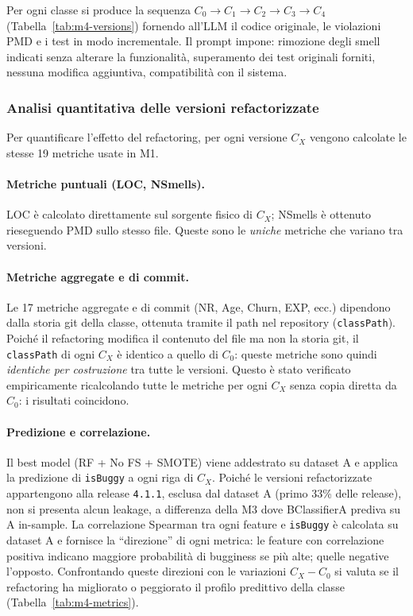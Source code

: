 Per ogni classe si produce la sequenza $C_0 \!\to\! C_1 \!\to\! C_2 \!\to\! C_3
\!\to\! C_4$ (Tabella~\ref{tab:m4-versions}) fornendo all'LLM il codice originale,
le violazioni PMD e i test in modo incrementale.
Il prompt impone: rimozione degli smell indicati senza alterare la funzionalità,
superamento dei test originali forniti, nessuna modifica aggiuntiva, compatibilità con il sistema.

\subsubsection{Analisi quantitativa delle versioni refactorizzate}

Per quantificare l'effetto del refactoring, per ogni versione $C_X$ vengono calcolate
le stesse 19 metriche usate in M1.

\paragraph{Metriche puntuali (LOC, NSmells).}
LOC è calcolato direttamente sul sorgente fisico di $C_X$; NSmells è ottenuto rieseguendo
PMD sullo stesso file. Queste sono le \emph{uniche} metriche che variano tra versioni.


\paragraph{Metriche aggregate e di commit.}
Le 17 metriche aggregate e di commit (NR, Age, Churn, EXP, ecc.) dipendono dalla storia git
della classe, ottenuta tramite il path nel repository (\texttt{classPath}).
Poiché il refactoring modifica il contenuto del file ma non la storia git,
il \texttt{classPath} di ogni $C_X$ è identico a quello di $C_0$: queste metriche
sono quindi \emph{identiche per costruzione} tra tutte le versioni.
Questo è stato verificato empiricamente ricalcolando tutte le metriche per ogni $C_X$
senza copia diretta da $C_0$: i risultati coincidono.

\paragraph{Predizione e correlazione.}
Il best model (RF + No FS + SMOTE) viene addestrato su dataset A e applica la predizione
di \texttt{isBuggy} a ogni riga di $C_X$.
Poiché le versioni refactorizzate appartengono alla release \texttt{4.1.1}, esclusa
dal dataset A (primo 33\% delle release), non si presenta alcun leakage, a differenza
della M3 dove BClassifierA prediva su A in-sample.
La correlazione Spearman tra ogni feature e \texttt{isBuggy} è calcolata su dataset A
e fornisce la ``direzione'' di ogni metrica: le feature con correlazione positiva
indicano maggiore probabilità di bugginess se più alte; quelle negative l'opposto.
Confrontando queste direzioni con le variazioni $C_X - C_0$ si valuta se il refactoring
ha migliorato o peggiorato il profilo predittivo della classe
(Tabella~\ref{tab:m4-metrics}).

